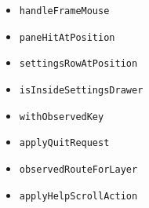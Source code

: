 \begin{itemize}
\tightlist
\item
  \texttt{h\allowbreak{}a\allowbreak{}n\allowbreak{}d\allowbreak{}l\allowbreak{}e\allowbreak{}F\allowbreak{}r\allowbreak{}a\allowbreak{}m\allowbreak{}e\allowbreak{}M\allowbreak{}o\allowbreak{}u\allowbreak{}s\allowbreak{}e}
\item
  \texttt{p\allowbreak{}a\allowbreak{}n\allowbreak{}e\allowbreak{}H\allowbreak{}i\allowbreak{}t\allowbreak{}A\allowbreak{}t\allowbreak{}P\allowbreak{}o\allowbreak{}s\allowbreak{}i\allowbreak{}t\allowbreak{}i\allowbreak{}o\allowbreak{}n}
\item
  \texttt{s\allowbreak{}e\allowbreak{}t\allowbreak{}t\allowbreak{}i\allowbreak{}n\allowbreak{}g\allowbreak{}s\allowbreak{}R\allowbreak{}o\allowbreak{}w\allowbreak{}A\allowbreak{}t\allowbreak{}P\allowbreak{}o\allowbreak{}s\allowbreak{}i\allowbreak{}t\allowbreak{}i\allowbreak{}o\allowbreak{}n}
\item
  \texttt{i\allowbreak{}s\allowbreak{}I\allowbreak{}n\allowbreak{}s\allowbreak{}i\allowbreak{}d\allowbreak{}e\allowbreak{}S\allowbreak{}e\allowbreak{}t\allowbreak{}t\allowbreak{}i\allowbreak{}n\allowbreak{}g\allowbreak{}s\allowbreak{}D\allowbreak{}r\allowbreak{}a\allowbreak{}w\allowbreak{}e\allowbreak{}r}
\item
  \texttt{w\allowbreak{}i\allowbreak{}t\allowbreak{}h\allowbreak{}O\allowbreak{}b\allowbreak{}s\allowbreak{}e\allowbreak{}r\allowbreak{}v\allowbreak{}e\allowbreak{}d\allowbreak{}K\allowbreak{}e\allowbreak{}y}
\item
  \texttt{a\allowbreak{}p\allowbreak{}p\allowbreak{}l\allowbreak{}y\allowbreak{}Q\allowbreak{}u\allowbreak{}i\allowbreak{}t\allowbreak{}R\allowbreak{}e\allowbreak{}q\allowbreak{}u\allowbreak{}e\allowbreak{}s\allowbreak{}t}
\item
  \texttt{o\allowbreak{}b\allowbreak{}s\allowbreak{}e\allowbreak{}r\allowbreak{}v\allowbreak{}e\allowbreak{}d\allowbreak{}R\allowbreak{}o\allowbreak{}u\allowbreak{}t\allowbreak{}e\allowbreak{}F\allowbreak{}o\allowbreak{}r\allowbreak{}L\allowbreak{}a\allowbreak{}y\allowbreak{}e\allowbreak{}r}
\item
  \texttt{a\allowbreak{}p\allowbreak{}p\allowbreak{}l\allowbreak{}y\allowbreak{}H\allowbreak{}e\allowbreak{}l\allowbreak{}p\allowbreak{}S\allowbreak{}c\allowbreak{}r\allowbreak{}o\allowbreak{}l\allowbreak{}l\allowbreak{}A\allowbreak{}c\allowbreak{}t\allowbreak{}i\allowbreak{}o\allowbreak{}n}
\end{itemize}

